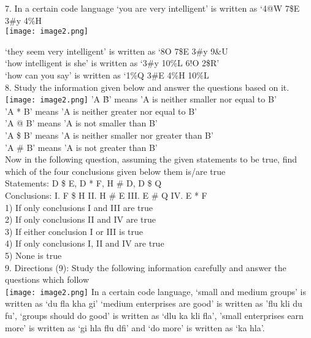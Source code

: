 \documentclass[
]{article}
\begin{document}
7. In a certain code language ‘you are very intelligent’ is written as ‘4@W 7\$E 3\#y 4\%H \\
\texttt{[image: image2.png]}

‘they seem very intelligent’ is written as ‘8\*O 7\$E 3\#y 9\&U\\
‘how intelligent is she’ is written as ‘3\#y 10\%L 6!O 2\$R’\\
‘how can you say’ is written as ‘1\%Q 3\#E 4\%H 10\%L\\

8. Study the information given below and answer the questions based on it.\\
\texttt{[image: image2.png]}
'A \^ B' means 'A is neither smaller nor equal to B'\\
'A * B' means 'A is neither greater nor equal to B'\\
'A @ B' means 'A is not smaller than B'\\
'A \$ B' means 'A is neither smaller nor greater than B'\\
'A \# B' means 'A is not greater than B'\\
Now in the following question, assuming the given statements to be true, find which of the four conclusions given below them is/are true\\
Statements: D \$ E, D * F, H \# D, D \$ Q\\
Conclusions: I. F \$ H II. H \# E III. E \# Q IV. E * F\\
1) If only conclusions I and III are true\\
2) If only conclusions II and IV are true\\
3) If either conclusion I or III is true\\
4) If only conclusions I, II and IV are true\\
5) None is true\\

9. Directions (9): Study the following information carefully and answer the questions which follow\\
\texttt{[image: image2.png]}
In a certain code language, ‘small and medium groups’ is written as ‘du fla kha gi’ ‘medium enterprises are good’ is written as 'flu kli du fu’, ‘groups should do good’ is written as ‘dlu ka kli fla’, 'small enterprises earn more’ is written as ‘gi hla flu dfi’ and ‘do more’ is written as ‘ka hla’.\\
\end{document}

